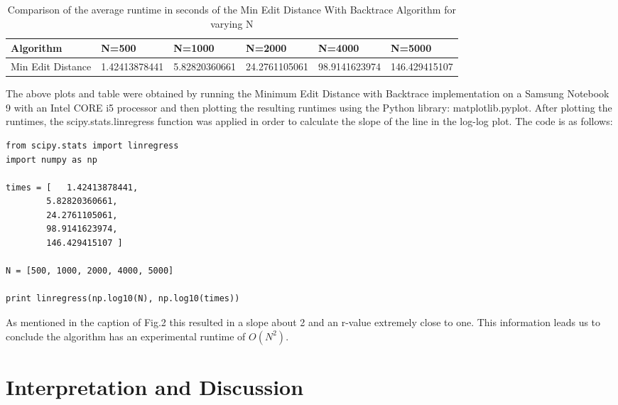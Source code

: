 \documentclass[10pt, onecolumn, draftclsnofoot, letterpaper, compsoc]{IEEEtran}
\begin{document}
\begin{table}[h]
\centering
	\caption{Comparison of the average runtime in seconds of the Min Edit Distance With Backtrace Algorithm for varying N}
    \begin{tabular}{|p{.15\linewidth}|p{.1\linewidth}|p{.1\linewidth}|p{.1\linewidth}|p{.1\linewidth}|p{.1\linewidth}|}

    \cline{3-3}

    \hline \textbf{Algorithm} & \textbf{N=500} & \textbf{N=1000} & \textbf{N=2000} & \textbf{N=4000} & \textbf{N=5000} \\ \hline

    Min Edit Distance & 1.42413878441 & 5.82820360661 & 24.2761105061 & 98.9141623974 & 146.429415107 \\ \hline

    \end{tabular}
\end{table}

\newpage

The above plots and table were obtained by running the Minimum Edit Distance with
Backtrace implementation on a Samsung Notebook 9 with an Intel CORE i5 processor
and then plotting the resulting runtimes using the Python library: matplotlib.pyplot.
After plotting the runtimes, the scipy.stats.linregress function was applied in order
to calculate the slope of the line in the log-log plot. The code is as follows: \\

\begin{lstlisting}
from scipy.stats import linregress
import numpy as np

times = [   1.42413878441,
        5.82820360661,
        24.2761105061,
        98.9141623974,
        146.429415107 ]

N = [500, 1000, 2000, 4000, 5000]

print linregress(np.log10(N), np.log10(times))

\end{lstlisting}

As mentioned in the caption of Fig.2 this resulted in a slope about 2 and an r-value
extremely close to one. This information leads us to conclude the algorithm has an
experimental runtime of \begin{math}O(N^2)\end{math}.

\newpage

\section{Interpretation and Discussion}
\end{document}
